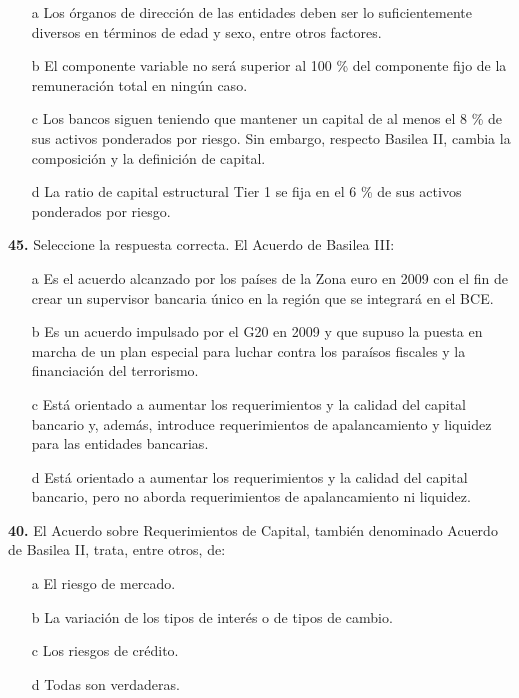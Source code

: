 \documentclass{nuevotema}
\begin{document}
\begin{itemize}
	\item[a] Los órganos de dirección de las entidades deben ser lo suficientemente diversos en términos de edad y sexo, entre otros factores.
	\item[b] El componente variable no será superior al 100 \% del componente fijo de la remuneración total en ningún caso. 
	\item[c] Los bancos siguen teniendo que mantener un capital de al menos el 8 \% de sus activos ponderados por riesgo. Sin embargo, respecto Basilea II, cambia la composición y la definición de capital.
	\item[d] La ratio de capital estructural Tier 1 se fija en el 6 \% de sus activos ponderados por riesgo.
\end{itemize}


\textbf{45.} Seleccione la respuesta correcta. El Acuerdo de Basilea III:

\begin{itemize}
	\item[a] Es el acuerdo alcanzado por los países de la Zona euro en 2009 con el fin de crear un supervisor bancaria único en la región que se integrará en el BCE.
	\item[b] Es un acuerdo impulsado por el G20 en 2009 y que supuso la puesta en marcha de un plan especial para luchar contra los paraísos fiscales y la financiación del terrorismo.
	\item[c] Está orientado a aumentar los requerimientos y la calidad del capital bancario y, además, introduce requerimientos de apalancamiento y liquidez para las entidades bancarias.
	\item[d] Está orientado a aumentar los requerimientos y la calidad del capital bancario, pero no aborda requerimientos de apalancamiento ni liquidez.
\end{itemize}


\textbf{40.} El Acuerdo sobre Requerimientos de Capital, también denominado Acuerdo de Basilea II, trata, entre otros, de:

\begin{itemize}
	\item[a] El riesgo de mercado.
	\item[b] La variación de los tipos de interés o de tipos de cambio.
	\item[c] Los riesgos de crédito.
	\item[d] Todas son verdaderas.
\end{itemize}
\end{document}
